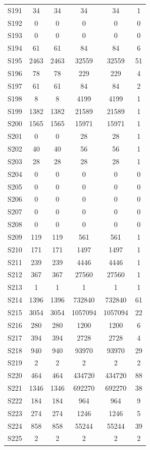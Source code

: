 {\begin{longtable}{l S[table-format=9.0] S[table-format=9.0] S[table-format=9.0] S[table-format=9.0] S[table-format=9.0]}
S191 & 34 & 34 & 34 & 34 & 1 \\
S192 & 0 & 0 & 0 & 0 & 0 \\
S193 & 0 & 0 & 0 & 0 & 0 \\
S194 & 61 & 61 & 84 & 84 & 6 \\
S195 & 2463 & 2463 & 32559 & 32559 & 51 \\
S196 & 78 & 78 & 229 & 229 & 4 \\
S197 & 61 & 61 & 84 & 84 & 2 \\
S198 & 8 & 8 & 4199 & 4199 & 1 \\
S199 & 1382 & 1382 & 21589 & 21589 & 1 \\
S200 & 1565 & 1565 & 15971 & 15971 & 1 \\
S201 & 0 & 0 & 28 & 28 & 1 \\
S202 & 40 & 40 & 56 & 56 & 1 \\
S203 & 28 & 28 & 28 & 28 & 1 \\
S204 & 0 & 0 & 0 & 0 & 0 \\
S205 & 0 & 0 & 0 & 0 & 0 \\
S206 & 0 & 0 & 0 & 0 & 0 \\
S207 & 0 & 0 & 0 & 0 & 0 \\
S208 & 0 & 0 & 0 & 0 & 0 \\
S209 & 119 & 119 & 561 & 561 & 1 \\
S210 & 171 & 171 & 1497 & 1497 & 1 \\
S211 & 239 & 239 & 4446 & 4446 & 1 \\
S212 & 367 & 367 & 27560 & 27560 & 1 \\
S213 & 1 & 1 & 1 & 1 & 1 \\
S214 & 1396 & 1396 & 732840 & 732840 & 61 \\
S215 & 3054 & 3054 & 1057094 & 1057094 & 22 \\
S216 & 280 & 280 & 1200 & 1200 & 6 \\
S217 & 394 & 394 & 2728 & 2728 & 4 \\
S218 & 940 & 940 & 93970 & 93970 & 29 \\
S219 & 2 & 2 & 2 & 2 & 2 \\
S220 & 464 & 464 & 434720 & 434720 & 88 \\
S221 & 1346 & 1346 & 692270 & 692270 & 38 \\
S222 & 184 & 184 & 964 & 964 & 9 \\
S223 & 274 & 274 & 1246 & 1246 & 5 \\
S224 & 858 & 858 & 55244 & 55244 & 39 \\
S225 & 2 & 2 & 2 & 2 & 2 \\

\end{longtable}}
